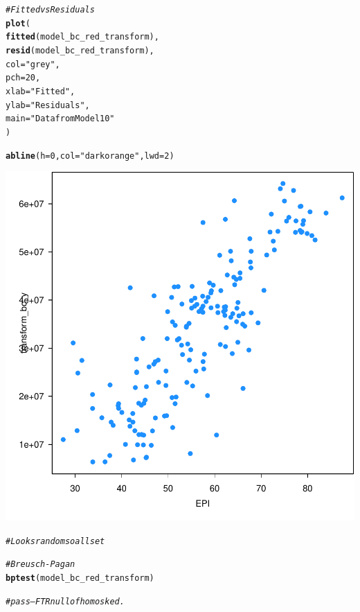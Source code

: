 \documentclass{article}\usepackage[]{graphicx}\usepackage[]{color}
\makeatletter
\newcommand{\hlnum}[1]{\textcolor[rgb]{0.686,0.059,0.569}{#1}}%
\newcommand{\hlstr}[1]{\textcolor[rgb]{0.192,0.494,0.8}{#1}}%
\newcommand{\hlcom}[1]{\textcolor[rgb]{0.678,0.584,0.686}{\textit{#1}}}%
\newcommand{\hlstd}[1]{\textcolor[rgb]{0.345,0.345,0.345}{#1}}%
\newcommand{\hlkwc}[1]{\textcolor[rgb]{0.333,0.667,0.333}{#1}}%
\newcommand{\hlkwd}[1]{\textcolor[rgb]{0.737,0.353,0.396}{\textbf{#1}}}%
\newenvironment{kframe}{%
 \def\at@end@of@kframe{}%
 \ifinner\ifhmode%
  \def\at@end@of@kframe{\end{minipage}}%
  \begin{minipage}{\columnwidth}%
 \fi\fi%
 \def\FrameCommand##1{\hskip\@totalleftmargin \hskip-\fboxsep
 \colorbox{shadecolor}{##1}\hskip-\fboxsep
     \hskip-\linewidth \hskip-\@totalleftmargin \hskip\columnwidth}%
 \MakeFramed {\advance\hsize-\width
   \@totalleftmargin\z@ \linewidth\hsize
   \@setminipage}}%
 {\par\unskip\endMakeFramed%
 \at@end@of@kframe}
\newenvironment{knitrout}{}{} %
\makeatother
\begin{document}
\begin{knitrout}
\begin{kframe}
{\ttfamily\noindent\bfseries\color{errorcolor}{\#\# Error in anova(model\_bc\_red\_transform): object 'model\_bc\_red\_transform' not found}}\begin{alltt}
\hlcom{# Fitted vs Residuals}
\hlkwd{plot}\hlstd{(}
  \hlkwd{fitted}\hlstd{(model_bc_red_transform),}
  \hlkwd{resid}\hlstd{(model_bc_red_transform),}
  \hlkwc{col} \hlstd{=} \hlstr{"grey"}\hlstd{,}
  \hlkwc{pch} \hlstd{=} \hlnum{20}\hlstd{,}
  \hlkwc{xlab} \hlstd{=} \hlstr{"Fitted"}\hlstd{,}
  \hlkwc{ylab} \hlstd{=} \hlstr{"Residuals"}\hlstd{,}
  \hlkwc{main} \hlstd{=} \hlstr{"Data from Model 10"}
\hlstd{)}
\end{alltt}


{\ttfamily\noindent\bfseries\color{errorcolor}{\#\# Error in fitted(model\_bc\_red\_transform): object 'model\_bc\_red\_transform' not found}}\begin{alltt}
\hlkwd{abline}\hlstd{(}\hlkwc{h} \hlstd{=} \hlnum{0}\hlstd{,} \hlkwc{col} \hlstd{=} \hlstr{"darkorange"}\hlstd{,} \hlkwc{lwd} \hlstd{=} \hlnum{2}\hlstd{)}
\end{alltt}
\end{kframe}

{\centering \includegraphics[width=.6\linewidth]{figure/Analysis-Rnwauto-report-34} 

}


\begin{kframe}\begin{alltt}
\hlcom{# Looks random so all set}

\hlcom{# Breusch-Pagan}
\hlkwd{bptest}\hlstd{(model_bc_red_transform)}
\end{alltt}


{\ttfamily\noindent\bfseries\color{errorcolor}{\#\# Error in bptest(model\_bc\_red\_transform): object 'model\_bc\_red\_transform' not found}}\begin{alltt}
\hlcom{# pass -- FTR null of homosked.}


\end{alltt}
\end{kframe}
\end{knitrout}
\end{document}
